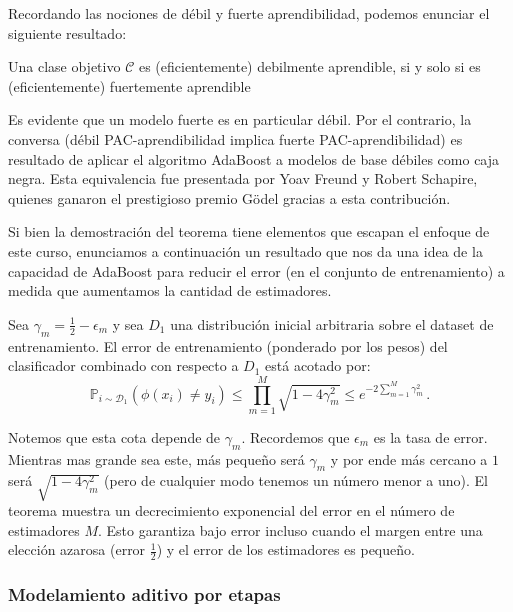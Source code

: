 Recordando las nociones de débil y fuerte aprendibilidad, podemos enunciar el siguiente resultado:

\begin{theorem}[Boosting]
    Una clase objetivo $\mathcal{C}$ es (eficientemente) debilmente aprendible, si y solo si es (eficientemente) fuertemente aprendible
\end{theorem}

Es evidente que un modelo fuerte es en particular débil. Por el contrario, la conversa (débil PAC-aprendibilidad implica fuerte PAC-aprendibilidad) es resultado de aplicar el algoritmo AdaBoost a modelos de base débiles como caja negra. Esta equivalencia fue presentada por Yoav Freund y Robert Schapire, quienes ganaron el prestigioso premio Gödel gracias a esta contribución.

Si bien la demostración del teorema tiene elementos que escapan el enfoque de este curso, enunciamos a continuación un resultado que nos da una idea de la capacidad de AdaBoost para reducir el error (en el conjunto de entrenamiento) a medida que aumentamos la cantidad de estimadores.

\begin{theorem}
    Sea $\gamma_m = \frac{1}{2} - \epsilon_m$ y sea $D_1$ una distribución inicial arbitraria sobre el dataset de entrenamiento. El error de entrenamiento (ponderado por los pesos) del clasificador combinado con respecto a $D_1$ está acotado por:
    \begin{equation}
        \mathbb{P}_{i \sim \mathcal{D}_1}(\phi(x_i) \neq y_i) \leq \prod^M_{m=1} \sqrt{1-4\gamma^2_m} \leq e^{-2\sum^M_{m=1} \gamma^2_m} \,.
    \end{equation}
\end{theorem}

Notemos que esta cota depende de $\gamma_m$. Recordemos que $\epsilon_m$ es la tasa de error. Mientras mas grande sea este, más pequeño será $\gamma_m$ y por ende más cercano a $1$ será $\sqrt{1-4\gamma^2_m}$ (pero de cualquier modo tenemos un número menor a uno). El teorema muestra un decrecimiento exponencial del error en el número de estimadores $M$. Esto garantiza bajo error incluso cuando el margen entre una elección azarosa (error $\frac{1}{2}$) y el error de los estimadores es pequeño.


\subsubsection{Modelamiento aditivo por etapas}

